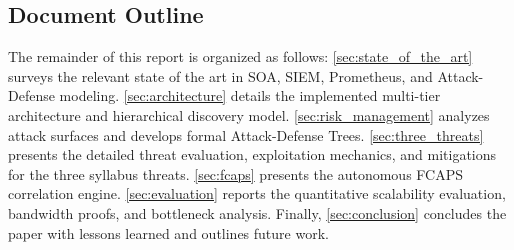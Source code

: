 \subsection{Document Outline}
The remainder of this report is organized as follows: \cref{sec:state_of_the_art} surveys the relevant state of the art in SOA, SIEM, Prometheus, and Attack-Defense modeling. \cref{sec:architecture} details the implemented multi-tier architecture and hierarchical discovery model. \cref{sec:risk_management} analyzes attack surfaces and develops formal Attack-Defense Trees. \cref{sec:three_threats} presents the detailed threat evaluation, exploitation mechanics, and mitigations for the three syllabus threats. \cref{sec:fcaps} presents the autonomous FCAPS correlation engine. \cref{sec:evaluation} reports the quantitative scalability evaluation, bandwidth proofs, and bottleneck analysis. Finally, \cref{sec:conclusion} concludes the paper with lessons learned and outlines future work.
